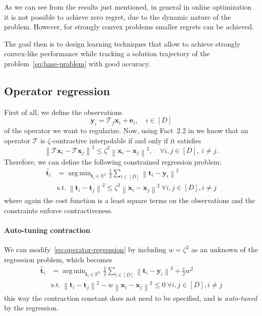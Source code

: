 \documentclass{article}
\DeclareMathOperator*{\argmin}{arg\,min}
\newcommand{\norm}[1]{\left\lVert#1\right\rVert}
\newcommand{\R}{\mathbb{R}}
\newcommand{\e}{\mathbold{e}}
\newcommand{\tv}{\mathbold{t}}
\newcommand{\x}{\mathbold{x}}
\newcommand{\y}{\mathbold{y}}
\newcommand{\T}{\mathcal{T}}
\begin{document}
As we can see from the results just mentioned, in general in online optimization it is not possible to achieve zero regret, due to the dynamic nature of the problem. However, for strongly convex problems smaller regrets can be achieved.

The goal then is to design learning techniques that allow to achieve strongly convex-like performance while tracking a solution trajectory of the problem~\eqref{eq:base-problem} with good accuracy.


\subsection{Operator regression}
First of all, we define the observations
$$
	\y_i = \T_f \x_i + \e_i, \quad i \in [D]
$$
of the operator we want to regularize. Now, using Fact~2.2 in \cite{ryu_operator_2020} we know that an operator $\T$ is $\zeta$-contractive interpolable if and only if it satisfies
$$
	\norm{\T \x_i - \T \x_j}^2 \leq \zeta^2 \norm{\x_i - \x_j}^2, \quad \forall i,j \in [D], \ i \neq j.
$$
Therefore, we can define the following constrained regression problem:
\begin{equation}\label{eq:operator-regression}
\begin{split}
	\hat{\tv}_i &= \argmin_{\tv_i \in \R^n} \frac{1}{2} \sum_{i \in [D]} \norm{\tv_i - \y_i}^2 \\
	&\text{s.t.} \ \norm{\tv_i - \tv_j}^2 \leq \zeta^2 \norm{\x_i - \x_j}^2 \ \forall i,j \in [D], i \neq j
\end{split}
\end{equation}
where again the cost function is a least square terms on the observations and the constraints enforce contractiveness.


\paragraph{Auto-tuning contraction}
We can modify~\eqref{eq:operator-regression} by including $w = \zeta^2$ as an unknown of the regression problem, which becomes
\begin{equation}
\begin{split}
	\hat{\tv}_i &= \argmin_{\tv_i \in \R^n} \frac{1}{2} \sum_{i \in [D]} \norm{\tv_i - \y_i}^2 + \frac{c}{2} w^2 \\
	&\text{s.t.} \ \norm{\tv_i - \tv_j}^2 - w \norm{\x_i - \x_j}^2 \leq 0 \ \forall i,j \in [D], i \neq j
\end{split}
\end{equation}
this way the contraction constant does not need to be specified, and is \emph{auto-tuned} by the regression.
\end{document}
